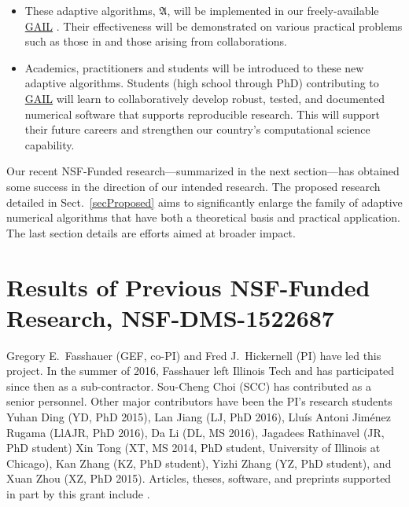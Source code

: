 \documentclass[11pt]{NSFamsart}
\newcommand{\GAIL}{\hyperlink{GAILlink}{GAIL}\xspace}
\newcommand{\fA}{\mathfrak{A}}
\begin{document}
\begin{itemize}
	\item These adaptive algorithms, $\fA$, will be implemented in our freely-available \GAIL 
	\cite{ChoEtal17b}.  Their 
	effectiveness will be demonstrated on various practical problems such as those in \cite{VirLib17a} 
	and those arising from collaborations.
	
	\item Academics, practitioners and students will be introduced to these 
	new adaptive algorithms.  Students (high school through PhD) contributing to \GAIL will learn to 
	collaboratively develop robust, tested, 
	and documented numerical software that supports reproducible research.  This will support their 
	future careers and strengthen our country's computational science capability.
	
\end{itemize}



Our recent NSF-Funded research---summarized in the next section---has obtained some success in 
the direction of our intended research.  The proposed research detailed 
in Sect.\ \ref{secProposed} aims to significantly enlarge the family of adaptive numerical 
algorithms that have both a theoretical basis and practical application.  The last section details are 
efforts aimed at broader impact.

\section{Results of Previous NSF-Funded Research,
NSF-DMS-1522687} \label{SectPrevious}

Gregory E.\ Fasshauer (GEF, co-PI) and Fred J.\ Hickernell (PI) have led this project.  In the summer 
of 
2016, Fasshauer left Illinois Tech and has participated since then as a sub-contractor.  
Sou-Cheng Choi (SCC) has contributed as a senior personnel.  Other major contributors 
have been the PI's research students Yuhan Ding (YD, PhD 2015), Lan Jiang (LJ, PhD 2016), 
Llu\'is Antoni Jim\'enez Rugama (LlAJR, PhD 2016), Da Li (DL, MS 2016), Jagadees Rathinavel (JR, 
PhD student)
Xin Tong (XT, MS 2014, PhD student, University of Illinois at Chicago), Kan Zhang (KZ, PhD 
student), Yizhi Zhang (YZ, PhD student), and Xuan Zhou (XZ, PhD 2015).  Articles, theses,  
software, and preprints supported in 
part by this 
grant 
include 
\cite{ala_augmented_2017, 
	ChoEtal17a,
	ChoEtal17b,
	Din15a, 
	GilEtal16a,
	GilJim16b,
	Hic17a,
	HicJim16a,
	HicEtal18a,
	HicEtal17a,
	JimHic16a,
	JohFasHic18a,
	Li16a,
	Liu17a,
	mccourt_stable_2017,
	mishra_hybrid_nodate,
	mishra_stable_nodate, 
	rashidinia_stable_nodate,
	vu_rbf-fd_nodate,
	Zha17a,
	Zho15a,
	ZhoHic15a}.
\end{document}
